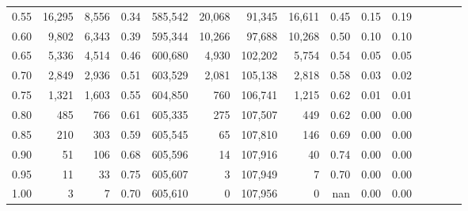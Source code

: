 \begin{tabular}{rrrcrrrrrrrrrrr}
0.55 &   16,295 &   8,556 &                                       0.34 &  585,542 &   20,068 &   91,345 &   16,611 &  0.45 &  0.15 &                         0.19 \\
0.60 &    9,802 &   6,343 &                                       0.39 &  595,344 &   10,266 &   97,688 &   10,268 &  0.50 &  0.10 &                         0.10 \\
0.65 &    5,336 &   4,514 &                                       0.46 &  600,680 &    4,930 &  102,202 &    5,754 &  0.54 &  0.05 &                         0.05 \\
0.70 &    2,849 &   2,936 &                                       0.51 &  603,529 &    2,081 &  105,138 &    2,818 &  0.58 &  0.03 &                         0.02 \\
0.75 &    1,321 &   1,603 &                                       0.55 &  604,850 &      760 &  106,741 &    1,215 &  0.62 &  0.01 &                         0.01 \\
0.80 &      485 &     766 &                                       0.61 &  605,335 &      275 &  107,507 &      449 &  0.62 &  0.00 &                         0.00 \\
0.85 &      210 &     303 &                                       0.59 &  605,545 &       65 &  107,810 &      146 &  0.69 &  0.00 &                         0.00 \\
0.90 &       51 &     106 &                                       0.68 &  605,596 &       14 &  107,916 &       40 &  0.74 &  0.00 &                         0.00 \\
0.95 &       11 &      33 &                                       0.75 &  605,607 &        3 &  107,949 &        7 &  0.70 &  0.00 &                         0.00 \\
1.00 &        3 &       7 &                                       0.70 &  605,610 &        0 &  107,956 &        0 &   nan &  0.00 &                         0.00 \\
\bottomrule
\end{tabular}
